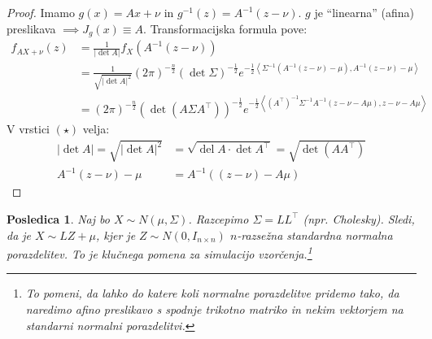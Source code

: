 \documentclass[12pt]{book}
\theoremstyle{definition}
\theoremstyle{plain}
\theoremstyle{plain}
\theoremstyle{plain}
\newtheorem{posledica}{Posledica}
\theoremstyle{remark}
\begin{document}
\begin{proof}
    Imamo $g(x)=A x+\nu$ in $g^{-1}(z)=A^{-1}(z-\nu)$. $g$ je “linearna” (afina) preslikava $\implies J_g(x) \equiv A$. Transformacijska formula pove: 
    \begin{align*}
        f_{A X+\nu}(z)&=\frac{1}{|\det A|} f_X\left(A^{-1}(z-\nu)\right) \\
        &=\frac{1}{\sqrt{|\det A|^2}}(2 \pi)^{-\frac{n}{2}}(\det \Sigma)^{-\frac{1}{2}} e^{-\frac{1}{2}\left\langle\Sigma^{-1}\left(A^{-1}(z - \nu)-\mu\right), A^{-1}(z-\nu)-\mu\right\rangle} \tag{$\star$} \\
        &=(2 \pi)^{-\frac{n}{2}}\left(\det\left(A \Sigma A^{\top}\right)\right)^{-\frac{1}{2}} e^{-\frac{1}{2}\left\langle\left(A^{\top}\right)^{-1} \Sigma^{-1} A^{-1}(z-\nu-A \mu), z-\nu - A\mu\right\rangle} 
    \end{align*}
    V vrstici $(\star)$ velja: 
    $$
    \begin{aligned}
        |\det A|=\sqrt{|\operatorname{det} A|^2}&=\sqrt{\operatorname{del} A \cdot \operatorname{det} A^{\top}}=\sqrt{\operatorname{det}\left(A A^{\top}\right)} \\
         A^{-1}(z-\nu)-\mu&=A^{-1}\left((z-\nu)-A \mu\right)    
    \end{aligned}
    $$
\end{proof}

\begin{posledica}
    Naj bo $X \sim N(\mu, \Sigma)$. Razcepimo $\Sigma=L L^{\top}$ (npr. Cholesky). Sledi, da je $X \sim L Z+\mu$, kjer je $Z \sim N\left(0, I_{n \times n}\right)$ $n$-razsežna standardna normalna porazdelitev. To je klučnega pomena za simulacijo vzorčenja.\footnote[6]{To pomeni, da lahko do katere koli normalne porazdelitve pridemo tako, da naredimo afino preslikavo s spodnje trikotno matriko in nekim vektorjem na standarni normalni porazdelitvi.}
\end{posledica}
\end{document}
